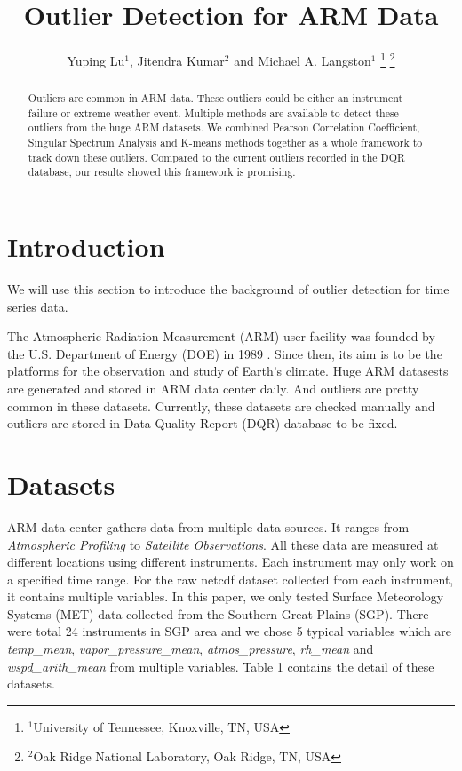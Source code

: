\documentclass[letterpaper, 10 pt, conference]{ieeeconf}  %
\title{\LARGE \bf
Outlier Detection for ARM Data
}
\author{Yuping Lu$^{1}$, Jitendra Kumar$^{2}$ and Michael A. Langston$^{1}$%
\thanks{$^{1}$University of Tennessee, Knoxville, TN, USA}%
\thanks{$^{2}$Oak Ridge National Laboratory, Oak Ridge, TN, USA}%
}
\begin{document}
\maketitle
\thispagestyle{empty}
\pagestyle{empty}

\begin{abstract}

Outliers are common in ARM data. These outliers could be either an instrument
failure or extreme weather event. Multiple methods are available to detect 
these outliers from the huge ARM datasets. We combined Pearson Correlation Coefficient, 
Singular Spectrum Analysis and K-means methods together as a whole framework
to track down these outliers. Compared to the current outliers recorded in the
DQR database, our results showed this framework is promising.

\end{abstract}


\section{Introduction}
We will use this section to introduce the background of outlier detection for 
time series data. \cite{gupta2014outlier} 

The Atmospheric Radiation Measurement (ARM) user facility was founded by the U.S. 
Department of Energy (DOE) in 1989 \cite{ARM}. Since then, its aim is to be the 
platforms for the observation and study of Earth's climate. Huge ARM datasests 
are generated and stored in ARM data center daily. And outliers are pretty common 
in these datasets. Currently, these datasets are checked manually and outliers 
are stored in Data Quality Report (DQR) database to be fixed.

\section{Datasets}
ARM data center gathers data from multiple data sources. It ranges from \textit{Atmospheric 
Profiling} to \textit{Satellite Observations}. All these data are measured at different 
locations using different instruments. Each instrument may only work on a specified
time range. For the raw netcdf dataset collected from each instrument, it contains
multiple variables. In this paper, we only tested Surface Meteorology Systems (MET)
data collected from the Southern Great Plains (SGP). There were total 24 instruments
in SGP area and we chose 5 typical variables which are \textit{temp\_mean}, 
\textit{vapor\_pressure\_mean}, \textit{atmos\_pressure}, 
\textit{rh\_mean} and \textit{wspd\_arith\_mean} from multiple variables. Table 1 
contains the detail of these datasets.
\end{document}
